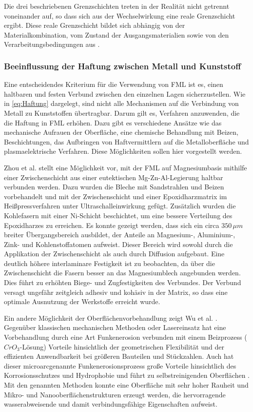 Die drei beschriebenen Grenzschichten treten in der Realität nicht getrennt voneinander auf, so dass sich aus der Wechselwirkung eine reale Grenzschicht ergibt. Diese reale Grenzschicht bildet sich abhängig von der Materialkombination, vom Zustand der Ausgangsmaterialien sowie von den Verarbeitungsbedingungen aus \cite{Flock.2012}. 

\subsubsection{Beeinflussung der Haftung zwischen Metall und Kunststoff}\label{sec:beeinflussung}

Eine entscheidendes Kriterium für die Verwendung von FML ist es, einen haltbaren und festen Verbund zwischen den einzelnen Lagen sicherzustellen. Wie in \autoref{eq:Haftung} dargelegt, sind nicht alle Mechanismen auf die Verbindung von Metall zu Kunststoffen übertragbar. Darum gilt es, Verfahren anzuwenden, die die Haftung in FML erhöhen.
Dazu gibt es verschiedene Ansätze wie das mechanische Aufrauen der Oberfläche, eine chemische Behandlung mit Beizen, Beschichtungen, das Aufbringen von Haftvermittlern auf die Metalloberfläche und plasmaelektrische Verfahren. Diese Möglichkeiten sollen hier vorgestellt werden.

Zhou et al. \cite{Zhou.2021} stellt eine Möglichkeit vor, mit der FML auf Magnesiumbasis mithilfe einer Zwischenschicht aus einer eutektischen Mg-Zn-Al-Legierung haltbar verbunden werden. Dazu wurden die Bleche mit Sandstrahlen und Beizen vorbehandelt und mit der Zwischenschicht und einer Epoxidharzmatrix im Heißpressverfahren unter Ultraschalleinwirkung gefügt. Zusätzlich wurden die Kohlefasern mit einer Ni-Schicht beschichtet, um eine bessere Verteilung des Epoxidharzes zu erreichen. Es konnte gezeigt werden, dass sich ein circa $350 \, \mu m$ breiter Übergangsbereich ausbildet, der Anteile an Magnesium-, Aluminium-, Zink- und Kohlenstoffatomen aufweist. Dieser Bereich wird sowohl durch die Applikation der Zwischenschicht als auch durch Diffusion aufgebaut. Eine deutlich höhere interlaminare Festigkeit ist zu beobachten, da über die Zwischenschicht die Fasern besser an das Magnesiumblech angebunden werden. Dies führt zu erhöhten Biege- und Zugfestigkeiten des Verbundes. Der Verbund versagt ungefähr zeitgleich adhesiv und kohäsiv in der Matrix, so dass eine optimale Ausnutzung der Werkstoffe erreicht wurde.

Ein andere Möglichkeit der Oberflächenvorbehandlung zeigt Wu et al. \cite{Wu.2016}. Gegenüber klassischen mechanischen Methoden oder Lasereinsatz hat eine Vorbehandlung durch eine Art Funkenerosion verbunden mit einem Beizprozess ($CrO_3$-Lösung) Vorteile hinsichtlich der geometrischen Flexibilität und der effizienten Anwendbarkeit bei größeren Bauteilen und Stückzahlen. Auch hat dieser \glqq microarc\grqq genannte Funkenerosionsprozess große Vorteile hinsichtlich des Korrosionsschutzes und Hydrophobie und führt zu selbstreinigenden Oberflächen \cite{Lu.2015}.
Mit den genannten Methoden konnte eine Oberfläche mit sehr hoher Rauheit und Mikro- und Nanooberflächenstrukturen erzeugt werden, die hervorragende wasserabweisende und damit verbindungsfähige Eigenschaften aufweist.

